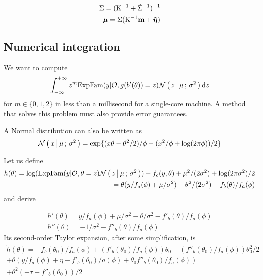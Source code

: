 \begin{align*}
\Sigma = (\mathrm K^{-1} + \tilde{\Sigma}^{-1})^{-1}\\
\boldsymbol\mu = \Sigma (\mathrm K^{-1} \mathbf m + \tilde{\boldsymbol\eta})
\end{align*}

\subsection{Numerical integration}

We want to compute
\begin{align*}
\int_{-\infty}^{+\infty} z^m \text{ExpFam} ({y |\mathcal{O}, g(b'(\theta))=z}) \mathcal{N}\left(\, { {z} \, \big| \, {\mu} } \,;\, { {\sigma^2} } \,\right)\mathrm dz
\end{align*}
for $m\in\{0, 1, 2\}$ in less than a millisecond for a single-core machine. A
method that solves this problem must also provide error guarantees.

A Normal distribution can also be written as
\begin{align*}
\mathcal{N}\left(\, { {x} \, \big| \, {\mu} } \,;\, { {\sigma^2} } \,\right) = \exp\{(x\theta - \theta^2/2)/\phi - (x^2/\phi + \log(2\pi\phi))/2\}
\end{align*}

Let us define
\begin{align*}
h(\theta)= \log(\text{ExpFam} ({y|\mathcal{O}, \theta=z}) \mathcal{N}\left(\, { {z} \, \big| \, {\mu} } \,;\, { {\sigma^2} } \,\right)) - f_c(y, \theta) +
		\mu^2/(2\sigma^2) + \log(2\pi\sigma^2)/2\\
		=\theta(y/f_a(\phi) + \mu/\sigma^2) - \theta^2/(2\sigma^2) - f_b(\theta)/f_a(\phi)
\end{align*}
and derive


\begin{align*}
h'(\theta) = y/f_a(\phi) + \mu/\sigma^2 - \theta/\sigma^2 - f'_b(\theta)/f_a(\phi)\\
h''(\theta) = -1/\sigma^2 - f''_b(\theta)/f_a(\phi)
\end{align*}
Its second-order Taylor expansion, after some simplification, is
\begin{align*}
\tilde h(\theta) = -f_b(\theta_0)/f_a(\phi) + (f'_b(\theta_0)/f_a(\phi))\theta_0 - (f''_b(\theta_0)/f_a(\phi))\theta_0^2/2\\
	+\theta (y/f_a(\phi) + \eta - f'_b(\theta_0)/a(\phi) + \theta_0 f''_b(\theta_0)/f_a(\phi))\\
	+\theta^2(-\tau - f''_b(\theta_0))/2
\end{align*}
